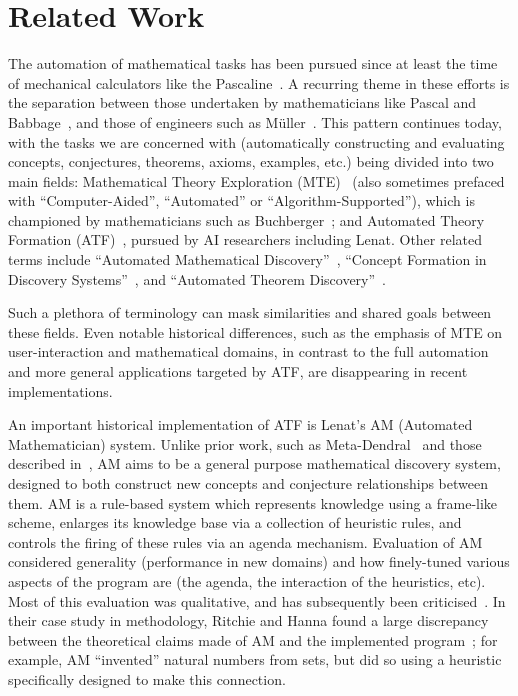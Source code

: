 \section{Related Work}
\label{sec:related-work}

The automation of mathematical tasks has been pursued since at least the time of
mechanical calculators like the Pascaline~\cite{d'ocagne}. A recurring theme in
these efforts is the separation between those undertaken by mathematicians like
Pascal and Babbage~\cite{bowden}, and those of engineers such as
M\"uller~\cite[p. 65]{lindgren}. This pattern continues today, with the tasks we
are concerned with (automatically constructing and evaluating concepts,
conjectures, theorems, axioms, examples, etc.) being divided into two main
fields: Mathematical Theory Exploration (MTE)~\cite{buchberger:06} (also
sometimes prefaced with ``Computer-Aided'', ``Automated'' or
``Algorithm-Supported''), which is championed by mathematicians such as
Buchberger~\cite{buchberger}; and Automated Theory Formation
(ATF)~\cite{lenat:77,colton:book}, pursued by AI researchers including Lenat.
Other related terms include ``Automated Mathematical
Discovery''~\cite{epstein:91,colton2000notion,esarm2008},
``Concept Formation in Discovery Systems''~\cite{haase}, and
``Automated Theorem Discovery''~\cite{roy}.

Such a plethora of terminology can mask similarities and shared goals between
these fields. Even notable historical differences, such as the emphasis of MTE
on user-interaction and mathematical domains, in contrast to the full automation
and more general applications targeted by ATF, are disappearing in recent
implementations.

An important historical implementation of ATF is Lenat's AM (Automated
Mathematician) system. Unlike prior work, such as
Meta-Dendral~\cite{buchanan:75} and those described in~\cite{winston}, AM aims
to be a general purpose mathematical discovery system, designed to both
construct new concepts and conjecture relationships between them. AM is a
rule-based system which represents knowledge using a frame-like scheme, enlarges
its knowledge base via a collection of heuristic rules, and controls the firing
of these rules via an agenda mechanism. Evaluation of AM considered generality
(performance in new domains) and how finely-tuned various aspects of the program
are (the agenda, the interaction of the heuristics, etc). Most of this
evaluation was qualitative, and has subsequently been
criticised~\cite[chap.~13]{colton:book}. In their case study in methodology,
Ritchie and Hanna found a large discrepancy between the theoretical claims made
of AM and the implemented program~\cite{ritchie1984case}; for example, AM ``invented''
natural numbers from sets, but did so using a heuristic specifically designed to
make this connection.

